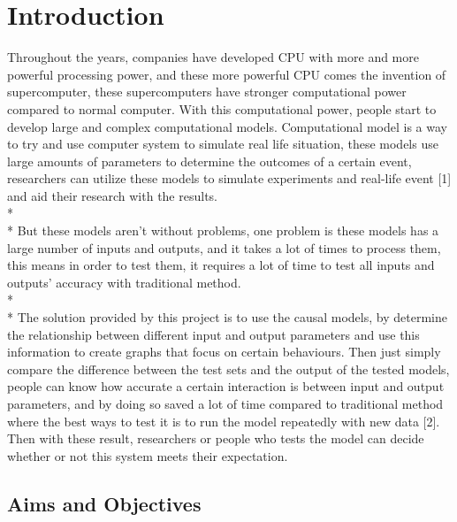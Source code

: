 \chapter{Introduction}

Throughout the years, companies have developed CPU with more and more powerful processing power, and these more powerful CPU comes the invention of supercomputer, these supercomputers have stronger computational power compared to normal computer. With this computational power, people start to develop large and complex computational models. Computational model is a way to try and use computer system to simulate real life situation, these models use large amounts of parameters to determine the outcomes of a certain event, researchers can utilize these models to simulate experiments and real-life event [1] and aid their research with the results.\\*\\*
But these models aren’t without problems, one problem is these models has a large number of inputs and outputs, and it takes a lot of times to process them, this means in order to test them, it requires a lot of time to test all inputs and outputs’ accuracy with traditional method. \\*\\*
The solution provided by this project is to use the causal models, by determine the relationship between different input and output parameters and use this information to create graphs that focus on certain behaviours. Then just simply compare the difference between the test sets and the output of the tested models, people can know how accurate a certain interaction is between input and output parameters, and by doing so saved a lot of time compared to traditional method where the best ways to test it is to run the model repeatedly with new data [2]. Then with these result, researchers or people who tests the model can decide whether or not this system meets their expectation.  


\section{Aims and Objectives}

